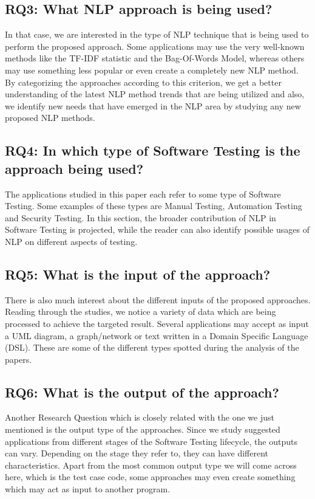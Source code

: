 \subsection*{RQ3: What NLP approach is being used?}
In that case, we are interested in the type of NLP technique that is being used to perform the proposed approach. Some applications may use the very well-known methods 
like the TF-IDF statistic and the Bag-Of-Words Model, whereas others may use something less popular or even create a completely new NLP method. By categorizing the approaches 
according to this criterion, we get a better understanding of the latest NLP method trends that are being utilized and also, we identify new needs that have emerged in the 
NLP area by studying any new proposed NLP methods.

\subsection*{RQ4: In which type of Software Testing is the approach being used?}
The applications studied in this paper each refer to some type of Software Testing. Some examples of these types are Manual Testing, Automation Testing and Security Testing. 
In this section, the broader contribution of NLP in Software Testing is projected, while the reader can also identify possible usages of NLP on different aspects of testing.

\subsection*{RQ5: What is the input of the approach?}
There is also much interest about the different inputs of the proposed approaches. Reading through the studies, we notice a variety of data which are 
being processed to achieve the targeted result. Several applications may accept as input a UML diagram, a graph/network or text written in a Domain Specific 
Language (DSL). These are some of the different types spotted during the analysis of the papers.

\subsection*{RQ6: What is the output of the approach?}
Another Research Question which is closely related with the one we just mentioned is the output type of the approaches. Since we study suggested applications 
from different stages of the Software Testing lifecycle, the outputs can vary. Depending on the stage they refer to, they can have different characteristics. 
Apart from the most common output type we will come across here, which is the test case code, some approaches may even create something which may act as 
input to another program.

